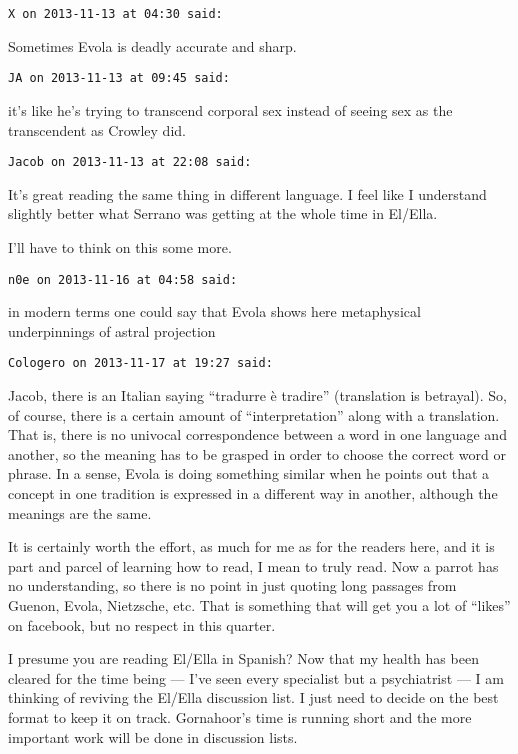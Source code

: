 \begin{footnotesize}\begin{sffamily}



\texttt{X on 2013-11-13 at 04:30 said: }

Sometimes Evola is deadly accurate and sharp.


\hfill

\texttt{JA on 2013-11-13 at 09:45 said: }

it's like he's trying to transcend corporal sex instead of seeing sex as the transcendent as Crowley did.


\hfill

\texttt{Jacob on 2013-11-13 at 22:08 said: }

It's great reading the same thing in different language. I feel like I understand slightly better what Serrano was getting at the whole time in El/Ella. 

I'll have to think on this some more.


\hfill


\hfill

\texttt{n0e on 2013-11-16 at 04:58 said: }

in modern terms one could say that Evola shows here metaphysical underpinnings of astral projection


\hfill

\texttt{Cologero on 2013-11-17 at 19:27 said: }

Jacob, there is an Italian saying “tradurre è tradire” (translation is betrayal). So, of course, there is a certain amount of “interpretation” along with a translation. That is, there is no univocal correspondence between a word in one language and another, so the meaning has to be grasped in order to choose the correct word or phrase. In a sense, Evola is doing something similar when he points out that a concept in one tradition is expressed in a different way in another, although the meanings are the same.

It is certainly worth the effort, as much for me as for the readers here, and it is part and parcel of learning how to read, I mean to truly read. Now a parrot has no understanding, so there is no point in just quoting long passages from Guenon, Evola, Nietzsche, etc. That is something that will get you a lot of “likes” on facebook, but no respect in this quarter.

I presume you are reading El/Ella in Spanish? Now that my health has been cleared for the time being — I've seen every specialist but a psychiatrist — I am thinking of reviving the El/Ella discussion list. I just need to decide on the best format to keep it on track. Gornahoor's time is running short and the more important work will be done in discussion lists.



\end{sffamily}
\end{footnotesize}
